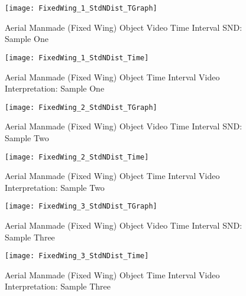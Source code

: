 \newpage  %


\begin{figure}[H]
	\center 
	\texttt{[image: FixedWing\_1\_StdNDist\_TGraph]}
	\captionsetup{list=no}	
	\caption[Aerial Manmade (Fixed Wing) Object Video Time Interval SND: Sample One]{Aerial Manmade (Fixed Wing) Object Video Time Interval SND: Sample One}
\end{figure}

\begin{figure}[H]
	\center 
	\texttt{[image: FixedWing\_1\_StdNDist\_Time]}
	\captionsetup{list=no}	
	\caption[Aerial Manmade (Fixed Wing) Object Time Interval Video Interpretation: Sample One]{Aerial Manmade (Fixed Wing) Object Time Interval Video Interpretation: Sample One}
\end{figure}

\newpage  %


\begin{figure}[H]
	\center 
	\texttt{[image: FixedWing\_2\_StdNDist\_TGraph]}
	\captionsetup{list=no}	
	\caption[Aerial Manmade (Fixed Wing) Object Video Time Interval SND: Sample Two]{Aerial Manmade (Fixed Wing) Object Video Time Interval SND: Sample Two}
\end{figure}

\begin{figure}[H]
	\center 
	\texttt{[image: FixedWing\_2\_StdNDist\_Time]}
	\captionsetup{list=no}	
	\caption[Aerial Manmade (Fixed Wing) Object Time Interval Video Interpretation: Sample Two]{Aerial Manmade (Fixed Wing) Object Time Interval Video Interpretation: Sample Two}
\end{figure}

\newpage  %


\begin{figure}[H]
	\center 
	\texttt{[image: FixedWing\_3\_StdNDist\_TGraph]}
	\captionsetup{list=no}	
	\caption[Aerial Manmade (Fixed Wing) Object Video Time Interval SND: Sample Three]{Aerial Manmade (Fixed Wing) Object Video Time Interval SND: Sample Three}
\end{figure}

\begin{figure}[H]
	\center 
	\texttt{[image: FixedWing\_3\_StdNDist\_Time]}
	\captionsetup{list=no}
	\caption[Aerial Manmade (Fixed Wing) Object Time Interval Video Interpretation: Sample Three]{Aerial Manmade (Fixed Wing) Object Time Interval Video Interpretation: Sample Three}
\end{figure}

